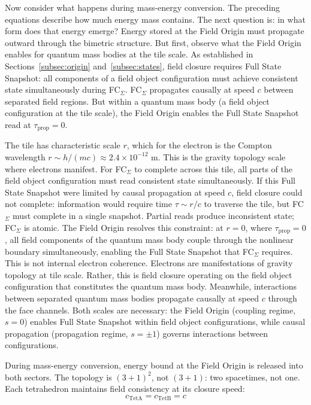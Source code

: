 \documentclass[aps,prd,preprint,superscriptaddress,showpacs,preprintnumbers,amsmath,amssymb,nofootinbib]{revtex4-2}
\begin{document}
Now consider what happens during mass-energy conversion. The preceding equations describe how much energy mass contains. The next question is: in what form does that energy emerge? Energy stored at the Field Origin must propagate outward through the bimetric structure. But first, observe what the Field Origin enables for quantum mass bodies at the tile scale. As established in Sections~\ref{subsec:origin} and~\ref{subsec:states}, field closure requires Full State Snapshot: all components of a field object configuration must achieve consistent state simultaneously during FC$_{\Sigma}$. FC$_{\Sigma}$ propagates causally at speed $c$ between separated field regions. But within a quantum mass body (a field object configuration at the tile scale), the Field Origin enables the Full State Snapshot read at $\tau_{\text{prop}} = 0$.

The tile has characteristic scale $r$, which for the electron is the Compton wavelength $r \sim h/(mc) \approx 2.4 \times 10^{-12}$ m. This is the gravity topology scale where electrons manifest. For FC$_{\Sigma}$ to complete across this tile, all parts of the field object configuration must read consistent state simultaneously. If this Full State Snapshot were limited by causal propagation at speed $c$, field closure could not complete: information would require time $\tau \sim r/c$ to traverse the tile, but FC$_{\Sigma}$ must complete in a single snapshot. Partial reads produce inconsistent state; FC$_{\Sigma}$ is atomic. The Field Origin resolves this constraint: at $r = 0$, where $\tau_{\text{prop}} = 0$, all field components of the quantum mass body couple through the nonlinear boundary simultaneously, enabling the Full State Snapshot that FC$_{\Sigma}$ requires. This is not internal electron coherence. Electrons are manifestations of gravity topology at tile scale. Rather, this is field closure operating on the field object configuration that constitutes the quantum mass body. Meanwhile, interactions between separated quantum mass bodies propagate causally at speed $c$ through the face channels. Both scales are necessary: the Field Origin (coupling regime, $s = 0$) enables Full State Snapshot within field object configurations, while causal propagation (propagation regime, $s = \pm 1$) governs interactions between configurations.

During mass-energy conversion, energy bound at the Field Origin is released into both sectors. The topology is $(3{+}1)^2$, not $(3{+}1)$: two spacetimes, not one. Each tetrahedron maintains field consistency at its closure speed:
\begin{equation}
c_{\text{TetA}} = c_{\text{TetB}} = c
\end{equation}
\end{document}
